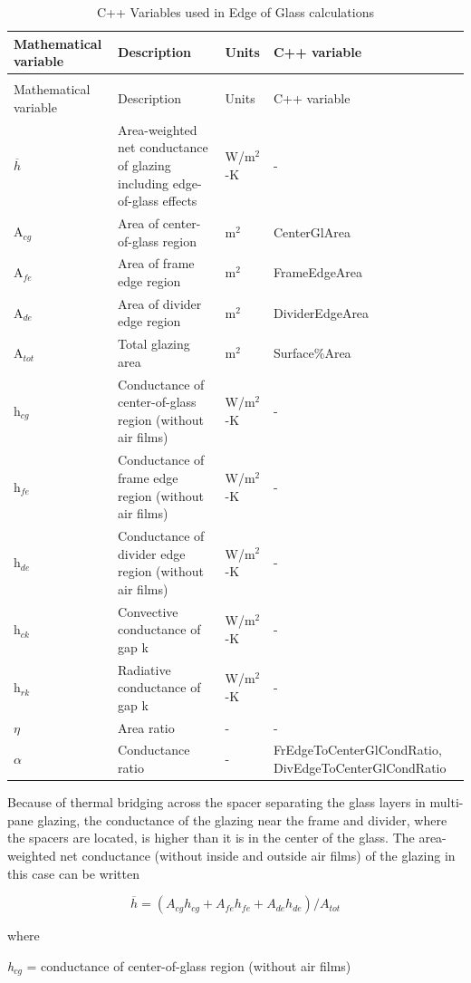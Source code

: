 \begin{longtable}[c]{p{1.0in}p{2.5in}p{1.0in}p{1.5in}}
\caption{C++ Variables used in Edge of Glass calculations \label{table:c++-variables-used-in-edge-of-glass}} \tabularnewline
\toprule 
Mathematical variable & Description & Units & C++ variable \tabularnewline
\midrule
\endfirsthead

\caption[]{C++ Variables used in Edge of Glass calculations} \tabularnewline
\toprule 
Mathematical variable & Description & Units & C++ variable \tabularnewline
\midrule
\endhead

\(\overline h\) & Area-weighted net conductance of glazing including edge-of-glass effects & W/m\(^{2}\)-K & - \tabularnewline
A\(_{cg}\) & Area of center-of-glass region & m\(^{2}\) & CenterGlArea \tabularnewline
A\(_{fe}\) & Area of frame edge region & m\(^{2}\) & FrameEdgeArea \tabularnewline
A\(_{de}\) & Area of divider edge region & m\(^{2}\) & DividerEdgeArea \tabularnewline
A\(_{tot}\) & Total glazing area & m\(^{2}\) & Surface\%Area \tabularnewline
h\(_{cg}\) & Conductance of center-of-glass region (without air films) & W/m\(^{2}\)-K & - \tabularnewline
h\(_{fe}\) & Conductance of frame edge region (without air films) & W/m\(^{2}\)-K & - \tabularnewline
h\(_{de}\) & Conductance of divider edge region (without air films) & W/m\(^{2}\)-K & - \tabularnewline
h\(_{ck}\) & Convective conductance of gap k & W/m\(^{2}\)-K & - \tabularnewline
h\(_{rk}\) & Radiative conductance of gap k & W/m\(^{2}\)-K & - \tabularnewline
$\eta$ & Area ratio & - & - \tabularnewline
$\alpha$ & Conductance ratio & - & FrEdgeToCenterGlCondRatio, DivEdgeToCenterGlCondRatio \tabularnewline
\bottomrule
\end{longtable}

Because of thermal bridging across the spacer separating the glass layers in multi-pane glazing, the conductance of the glazing near the frame and divider, where the spacers are located, is higher than it is in the center of the glass. The area-weighted net conductance (without inside and outside air films) of the glazing in this case can be written

\begin{equation}
\overline h  = \left( {{A_{cg}}{h_{cg}} + {A_{fe}}{h_{fe}} + {A_{de}}{h_{de}}} \right)/{A_{tot}}
\label{eq:AreaWeightedNetConductance}
\end{equation}

where

\emph{h\(_{cg}\)} = conductance of center-of-glass region (without air films)

